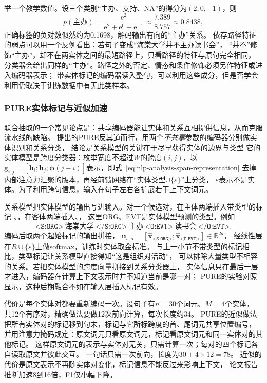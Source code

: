 举一个教学数值。设三个类别“主办、支持、NA”的得分为$(2,0,-1)$，则
\[
  p(\text{主办})=\frac{\mathrm{e}^{2}}{\mathrm{e}^{2}+\mathrm{e}^{0}+\mathrm{e}^{-1}}
  \approx\frac{7.389}{8.757}\approx0.8438,
\]
正确标签的负对数似然约为0.1698，解码输出有向的“主办”关系。
依存路径特征的弱点可以用一个反例看出：若句子变成“海棠大学并不主办读书会”，
“并不”修饰“主办”，却不在两实体之间的最短路径上，只看路径的特征与原句完全相同，
分类器会给出同样的“主办”。路径之外的否定、情态和条件修饰必须另作特征或进入编码器表示；
带实体标记的编码器读入整句，可以利用这些成分，但是否学会利用仍取决于训练数据中有无此类样本。

\subsubsection{PURE实体标记与近似加速}
\label{sec:nlp-extraction-pure}

联合抽取的一个常见论点是：共享编码器能让实体和关系互相提供信息，从而克服流水线的缺陷。
\citeauthor{zhong2021pure}提出的PURE反其道而行，用两个\emph{不共享}参数的编码器分别做实体识别和关系分类，
结论是关系模型的关键在于尽早获得实体的边界与类型
它的实体模型是跨度分类器：枚举宽度不超过$W$的跨度$(i,j)$，以
$\bm{g}_{i,j}=[\bm{h}_i;\bm{h}_j;\bm{\phi}(j-i)]$表示，即式~\eqref{eq:nlp-analysis-span-representation}
去掉内部注意力汇聚的版本，再经前馈网络在“实体类型$\cup\{\varepsilon\}$”上分类，
$\varepsilon$表示不是实体。为了利用跨句信息，输入在句子左右各扩展若干上下文词元。

关系模型把实体模型的输出写进输入。对一个候选对，在主体两端插入带类型的标记
、，在客体两端插入、，
这里ORG、EVT是实体模型预测的类型。例如
\[
  \texttt{<S:ORG>}\ \text{海棠大学}\ \texttt{</S:ORG>}\ \text{主办}\
  \texttt{<O:EVT>}\ \text{读书会}\ \texttt{</O:EVT>}.
\]
编码后取两个起始标记的输出拼接，
$\bm{u}_{s,o}=[\hat{\bm{x}}_{\texttt{<S:ORG>}};\hat{\bm{x}}_{\texttt{<O:EVT>}}]\in\mathbb{R}^{2d}$，
经线性层在$R\cup\{\varepsilon\}$上做softmax，训练时实体取金标准。
与上一小节不带类型的标记相比，类型标记让关系模型直接得知“这是组织对活动”，
可以排除大量类型不相容的关系。若把实体模型的跨度向量拼接到关系分类器上，
实体信息只在最后一层才进入，编码器在计算上下文表示时并不知道当前是哪一对；
PURE的实验对照显示，这种后期融合不如在输入层插入标记有效。

代价是每个实体对都要重新编码一次。设句子有$n=30$个词元、$M=4$个实体，
共12个有序对，精确做法要做12次前向计算，每次长度约34。
PURE的近似做法把所有实体对的标记移到句末，标记与它所标跨度的首、尾词元共享位置编号，
并用注意力掩码规定：原文词元只看原文词元，标记看原文词元和同一实体对的其他标记。
这样原文词元的表示与实体对无关，只需计算一次；每对的四个标记各自读取原文并彼此交互。
一句话只需一次前向，长度为$30+4\times12=78$。
近似的代价是原文表示不再随实体对变化，标记信息不能反过来影响上下文，
论文报告推断加速8到16倍，F1仅小幅下降。

